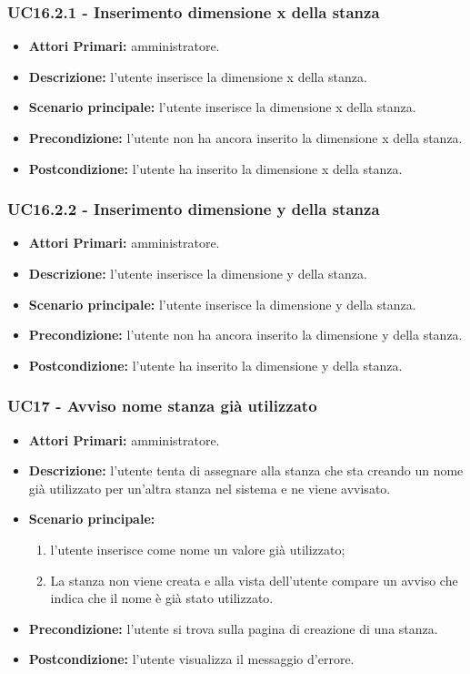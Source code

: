 \subsubsection{ UC16.2.1 - Inserimento dimensione x della stanza}
\begin{itemize}
	\item\textbf{Attori Primari:}
	amministratore.
	\item\textbf{Descrizione:} 
	l'utente inserisce la dimensione x della stanza.
	\item\textbf{Scenario principale:} 
	l'utente inserisce la dimensione x della stanza.
	\item\textbf{Precondizione:} 
	l'utente non ha ancora inserito la dimensione x della stanza.
	\item\textbf{Postcondizione:}
	l'utente ha inserito la dimensione x della stanza.
\end{itemize}
\subsubsection{ UC16.2.2 - Inserimento dimensione y della stanza}
\begin{itemize}
	\item\textbf{Attori Primari:}
	amministratore.
	\item\textbf{Descrizione:} 
	l'utente inserisce la dimensione y della stanza.
	\item\textbf{Scenario principale:} 
	l'utente inserisce la dimensione y della stanza.
	\item\textbf{Precondizione:} 
	l'utente non ha ancora inserito la dimensione y della stanza.
	\item\textbf{Postcondizione:}
	l'utente ha inserito la dimensione y della stanza.
\end{itemize}
\subsubsection{ UC17 - Avviso nome stanza già utilizzato}
\begin{itemize}
	\item\textbf{Attori Primari:}
	amministratore.
	\item\textbf{Descrizione:}
	l'utente tenta di assegnare alla stanza che sta creando un nome già utilizzato per un'altra stanza nel sistema e ne viene avvisato.
	\item\textbf{Scenario principale:}
	\begin{enumerate}
		\item l'utente inserisce come nome un valore già utilizzato;
		\item La stanza non viene creata e alla vista dell'utente compare un avviso che indica che il nome è già stato utilizzato. 
	\end{enumerate}
	\item\textbf{Precondizione:}
	l'utente si trova sulla pagina di creazione di una stanza.
	\item\textbf{Postcondizione:}
	l'utente visualizza il messaggio d'errore.
\end{itemize}

